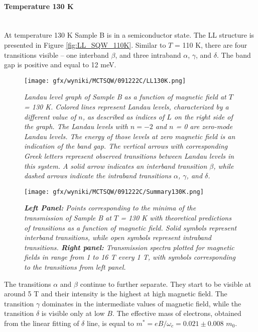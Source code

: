 \documentclass[titlepage,a4paper]{book}
\newcommand{\wciecie}{\quad\phantom{v}}
\newcommand{\myparagraph}[1]{\paragraph{#1}\mbox{}\\}
\begin{document}
\myparagraph{Temperature 130 K}
\wciecie
At temperature 130 K Sample B is in a semiconductor state. The LL structure is presented in Figure \ref{fig:LL_SQW_110K}. Similar to $T$ = 110 K, there are four transitions visible -- one interband $\beta$, and three intraband $\alpha$, $\gamma$, and $\delta$. The band gap is positive and equal to 12 meV.

\begin{figure}[H]
	\centering
	\texttt{[image: gfx/wyniki/MCTSQW/091222C/LL130K.png]}
	\vspace{-10pt}
	\caption{\textit{Landau level graph of Sample B as a function of magnetic field at $T$ = 130 K. Colored lines represent Landau levels, characterized by a different value of $n$, as described as indices of $L$ on the right side of the graph. The Landau levels with $n = -2$ and $n$ = 0 are zero-mode Landau levels. The energy of those levels at zero magnetic field is an indication of the band gap. The vertical arrows with corresponding Greek letters represent observed transitions between Landau levels in this system. A solid arrow indicates an interband transition $\beta$, while dashed arrows indicate the intraband transitions $\alpha$, $\gamma$, and $\delta$.}}
	\label{fig:LL_SQW_130K}
\end{figure}
\begin{figure}[H]
	\centering
	\texttt{[image: gfx/wyniki/MCTSQW/091222C/Summary130K.png]}
	\vspace{-10pt}
	\caption{\textit{\textbf{Left Panel:} Points corresponding to the minima of the transmission of Sample B at $T$ = 130 K with theoretical predictions of transitions as a function of magnetic field. Solid symbols represent interband transitions, while open symbols represent intraband transitions. \textbf{Right panel:} Transmission spectra plotted for magnetic fields in range from 1 to 16 T every 1 T, with symbols corresponding to the transitions from left panel.}}
	\label{fig:Summary_SQW_130K}
\end{figure}

The transitions $\alpha$ and $\beta$ continue to further separate. They start to be visible at around 5 T and their intensity is the highest at high magnetic field. The transition $\gamma$ dominates in the intermediate values of magnetic field, while the transition $\delta$ is visible only at low $B$. The effective mass of electrons, obtained from the linear fitting of $\delta$ line, is equal to $m^* = eB/\omega_c = 0.021 \pm 0.008$ $m_0$.
\end{document}
